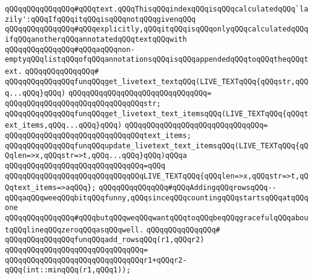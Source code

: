\verb|qQQqqQQqqQQqqQQq#qQQqtext.qQQqThisqQQqindexqQQqisqQQqcalculatedqQQq`lazily':qQQqIfqQQqitqQQqisqQQqnotqQQqgivenqQQq|\newline
\verb|qQQqqQQqqQQqqQQq#qQQqexplicitly,qQQqitqQQqisqQQqonlyqQQqcalculatedqQQqifqQQqanotherqQQqannotatedqQQqtextqQQqwith|\newline
\verb|qQQqqQQqqQQqqQQq#qQQqaqQQqnon-emptyqQQqlistqQQqofqQQqannotationsqQQqisqQQqappendedqQQqtoqQQqtheqQQqtext.|\newline
\verb|qQQqqQQqqQQqqQQq#|\newline
\verb|qQQqqQQqqQQqqQQqfunqQQqget_livetext_textqQQq(LIVE_TEXTqQQq{qQQqstr,qQQq...qQQq}qQQq)|\newline
\verb|qQQqqQQqqQQqqQQqqQQqqQQqqQQqqQQq=|\newline
\verb|qQQqqQQqqQQqqQQqqQQqqQQqqQQqqQQqstr;|\newline
\newline
\verb|qQQqqQQqqQQqqQQqfunqQQqget_livetext_text_itemsqQQq(LIVE_TEXTqQQq{qQQqtext_items,qQQq...qQQq}qQQq)|\newline
\verb|qQQqqQQqqQQqqQQqqQQqqQQqqQQqqQQq=|\newline
\verb|qQQqqQQqqQQqqQQqqQQqqQQqqQQqqQQqtext_items;|\newline
\newline
\verb|qQQqqQQqqQQqqQQqfunqQQqupdate_livetext_text_itemsqQQq(LIVE_TEXTqQQq{qQQqlen=>x,qQQqstr=>t,qQQq...qQQq}qQQq)qQQqa|\newline
\verb|qQQqqQQqqQQqqQQqqQQqqQQqqQQqqQQq=qQQq|\newline
\verb|qQQqqQQqqQQqqQQqqQQqqQQqqQQqqQQqLIVE_TEXTqQQq{qQQqlen=>x,qQQqstr=>t,qQQqtext_items=>aqQQq};|\newline
\newline
\newline
\verb|qQQqqQQqqQQqqQQq#qQQqAddingqQQqrowsqQQq--qQQqaqQQqweeqQQqbitqQQqfunny,qQQqsinceqQQqcountingqQQqstartsqQQqatqQQqone|\newline
\verb|qQQqqQQqqQQqqQQq#qQQqbutqQQqweqQQqwantqQQqtoqQQqbeqQQqgracefulqQQqaboutqQQqlineqQQqzeroqQQqasqQQqwell.|\newline
\verb|qQQqqQQqqQQqqQQq#|\newline
\verb|qQQqqQQqqQQqqQQqfunqQQqadd_rowsqQQq(r1,qQQqr2)|\newline
\verb|qQQqqQQqqQQqqQQqqQQqqQQqqQQqqQQq=|\newline
\verb|qQQqqQQqqQQqqQQqqQQqqQQqqQQqqQQqr1+qQQqr2-qQQq(int::minqQQq(r1,qQQq1));|\newline
\newline
